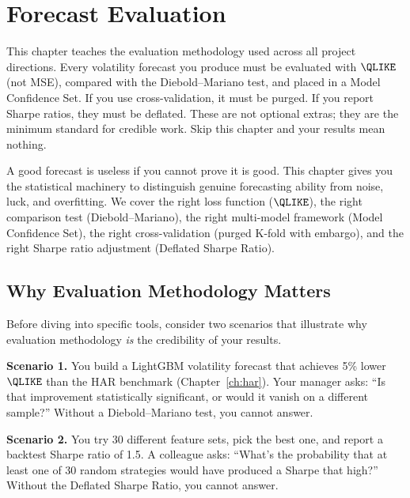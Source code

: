 \chapter{Forecast Evaluation}
\label{ch:evaluation}

\begin{application}
This chapter teaches the evaluation methodology used across all project directions.
Every volatility forecast you produce must be evaluated with $\QLIKE$ (not MSE),
compared with the Diebold--Mariano test, and placed in a Model Confidence Set.
If you use cross-validation, it must be purged.
If you report Sharpe ratios, they must be deflated.
These are not optional extras; they are the minimum standard for credible work.
Skip this chapter and your results mean nothing.
\end{application}

A good forecast is useless if you cannot prove it is good.
This chapter gives you the statistical machinery to distinguish genuine forecasting ability from noise, luck, and overfitting.
We cover the right loss function ($\QLIKE$), the right comparison test (Diebold--Mariano), the right multi-model framework (Model Confidence Set), the right cross-validation (purged K-fold with embargo), and the right Sharpe ratio adjustment (Deflated Sharpe Ratio).


\section{Why Evaluation Methodology Matters}
\label{sec:eval-why}

Before diving into specific tools, consider two scenarios that illustrate why evaluation methodology \emph{is} the credibility of your results.

\textbf{Scenario 1.}
You build a LightGBM volatility forecast that achieves 5\% lower $\QLIKE$ than the HAR benchmark (Chapter~\ref{ch:har}).
Your manager asks: ``Is that improvement statistically significant, or would it vanish on a different sample?''
Without a Diebold--Mariano test, you cannot answer.

\textbf{Scenario 2.}
You try 30 different feature sets, pick the best one, and report a backtest Sharpe ratio of 1.5.
A colleague asks: ``What's the probability that at least one of 30 random strategies would have produced a Sharpe that high?''
Without the Deflated Sharpe Ratio, you cannot answer.

